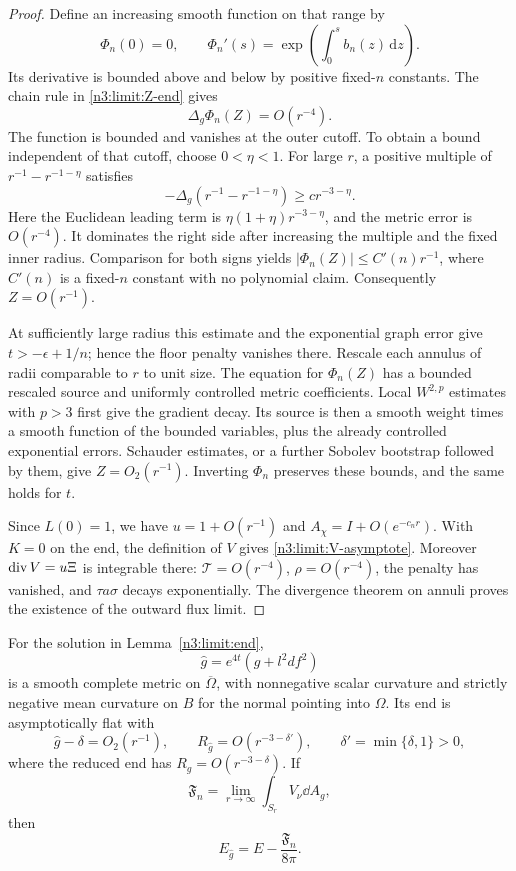 \begin{proof}
Define an increasing smooth function on that range by
\[
 \Phi_n(0)=0,\qquad
 \Phi_n'(s)=\exp\!\left(\int_0^s b_n(z)\,\mathrm dz\right).
\]
Its derivative is bounded above and below by positive fixed-\(n\)
constants. The chain rule in \eqref{n3:limit:Z-end} gives
\[
                         \Delta_g\Phi_n(Z)=O(r^{-4}).
\]
The function is bounded and vanishes at the outer cutoff. To obtain
a bound independent of that cutoff, choose \(0<\eta<1\).
For large \(r\), a positive multiple of
\(r^{-1}-r^{-1-\eta}\) satisfies
\[
 -\Delta_g(r^{-1}-r^{-1-\eta})\ge c r^{-3-\eta}.
\]
Here the Euclidean leading term is
\(\eta(1+\eta)r^{-3-\eta}\), and the metric error is \(O(r^{-4})\).
It dominates the right side after increasing the multiple and the
fixed inner radius. Comparison for both signs yields
\(|\Phi_n(Z)|\le C'(n) r^{-1}\), where \(C'(n)\) is a fixed-\(n\)
constant with no polynomial claim. Consequently \(Z=O(r^{-1})\).

At sufficiently large radius this estimate and the exponential graph
error give \(t>-\epsilon+1/n\); hence the floor penalty vanishes there.
Rescale each annulus of radii comparable to \(r\) to unit size.
The equation for \(\Phi_n(Z)\) has a bounded rescaled source and
uniformly controlled metric coefficients. Local \(W^{2,p}\)
estimates with \(p>3\) first give the gradient decay. Its source is
then a smooth weight times a smooth function of the bounded variables,
plus the already controlled exponential errors. Schauder estimates,
or a further Sobolev bootstrap followed by them, give
\(Z=O_2(r^{-1})\). Inverting \(\Phi_n\) preserves these bounds, and
the same holds for \(t\).

Since \(L(0)=1\), we have \(u=1+O(r^{-1})\) and
\(A_\chi=I+O(e^{-c_n r})\). With \(K=0\) on the end, the definition
of \(V\) gives \eqref{n3:limit:V-asymptote}.
Moreover \(\operatorname{div} V=u\Xi\) is integrable there:
\(\mathcal T=O(r^{-4})\), \(\rho=O(r^{-4})\), the penalty has vanished,
and \(\tau a\sigma\) decays exponentially. The divergence theorem on
annuli proves the existence of the outward flux limit.
\end{proof}

\begin{lemma}\label{n3:limit:geometry}
For the solution in Lemma~\ref{n3:limit:end},
\[
                         \hat g=e^{4t}(g+l^2df^2)
\]
is a smooth complete metric on \(\overline\Omega\), with nonnegative
scalar curvature and strictly negative mean curvature on \(B\) for
the normal pointing into \(\Omega\).
Its end is asymptotically flat with
\[
 \hat g-\delta=O_2(r^{-1}),\qquad
 R_{\hat g}=O(r^{-3-\delta'}),\qquad
 \delta'=\min\{\delta,1\}>0,
\]
where the reduced end has \(R_g=O(r^{-3-\delta})\).
If
\[
                 \mathfrak F_n=\lim_{r\to\infty}
                    \int_{S_r}V_\nu\dd A_g,
\]
then
\begin{equation}\label{n3:limit:adm}
                         E_{\hat g}=E-\frac{\mathfrak F_n}{8\pi}.
\end{equation}
\end{lemma}

